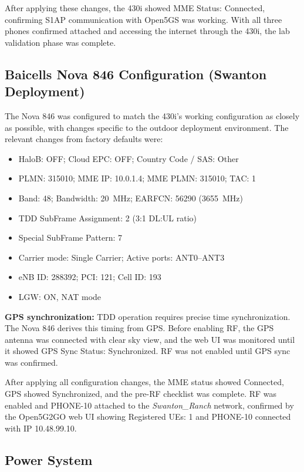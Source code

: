 \documentclass[
    left=1.5in,
    right=1.25in,
    top=1.25in,
    bottom=1.25in
]{CalPolySeniorProject}
\begin{document}
After applying these changes, the 430i showed MME Status: Connected, confirming
S1AP communication with Open5GS was working. With all three phones confirmed
attached and accessing the internet through the 430i, the lab validation phase
was complete.

\subsection{Baicells Nova 846 Configuration (Swanton Deployment)}

The Nova 846 was configured to match the 430i's working configuration as closely
as possible, with changes specific to the outdoor deployment environment. The
relevant changes from factory defaults were:

\begin{itemize}
    \item HaloB: OFF; Cloud EPC: OFF; Country Code / SAS: Other
    \item PLMN: 315010; MME IP: 10.0.1.4; MME PLMN: 315010; TAC: 1
    \item Band: 48; Bandwidth: 20~MHz; EARFCN: 56290 (3655~MHz)
    \item TDD SubFrame Assignment: 2 (3:1 DL:UL ratio)
    \item Special SubFrame Pattern: 7
    \item Carrier mode: Single Carrier; Active ports: ANT0--ANT3
    \item eNB ID: 288392; PCI: 121; Cell ID: 193
    \item LGW: ON, NAT mode
\end{itemize}

\textbf{GPS synchronization:} TDD operation requires precise time
synchronization. The Nova 846 derives this timing from GPS. Before enabling RF,
the GPS antenna was connected with clear sky view, and the web UI was monitored
until it showed GPS Sync Status: Synchronized. RF was not enabled until GPS sync
was confirmed.

After applying all configuration changes, the MME status showed Connected, GPS
showed Synchronized, and the pre-RF checklist was complete. RF was enabled and
PHONE-10 attached to the \textit{Swanton\_Ranch} network, confirmed by the
Open5G2GO web UI showing Registered UEs: 1 and PHONE-10 connected with IP
10.48.99.10.

\subsection{Power System}
\end{document}
